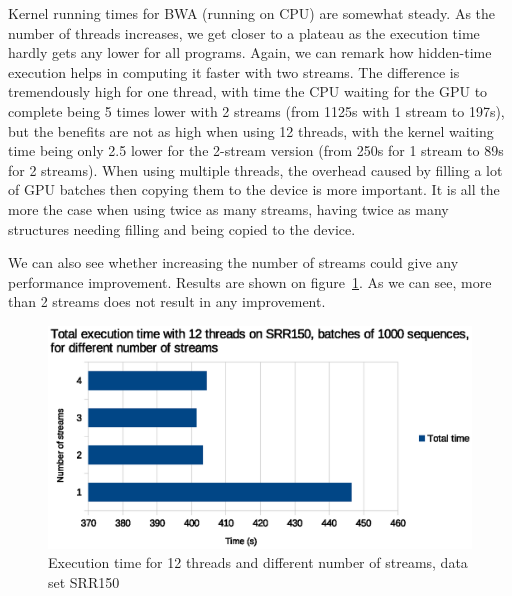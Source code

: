 Kernel running times for BWA (running on CPU) are somewhat steady. As the number of threads increases, we get closer to a plateau as the execution time hardly gets any lower for all programs. Again, we can remark how hidden-time execution helps in computing it faster with two streams. The difference is tremendously high for one thread, with time the CPU waiting for the GPU to complete being 5 times lower with 2 streams (from 1125s with 1 stream to 197s), but the benefits are not as high when using 12 threads, with the kernel waiting time being only 2.5 lower for the 2-stream version (from 250s for 1 stream to 89s for 2 streams). When using multiple threads, the overhead caused by filling a lot of GPU batches then copying them to the device is more important. It is all the more the case when using twice as many streams, having twice as many structures needing filling and being copied to the device.

We can also see whether increasing the number of streams could give any performance improvement. Results are shown on figure~\ref{fig:exec-time-nbstreams}. As we can see, more than 2 streams does not result in any improvement. 

\begin{figure}[h]
	\centering
	\includegraphics[width=0.9\linewidth]{exec-time-nbstreams}
	\caption{Execution time for 12 threads and different number of streams, data set SRR150}
	\label{fig:exec-time-nbstreams}
\end{figure}

